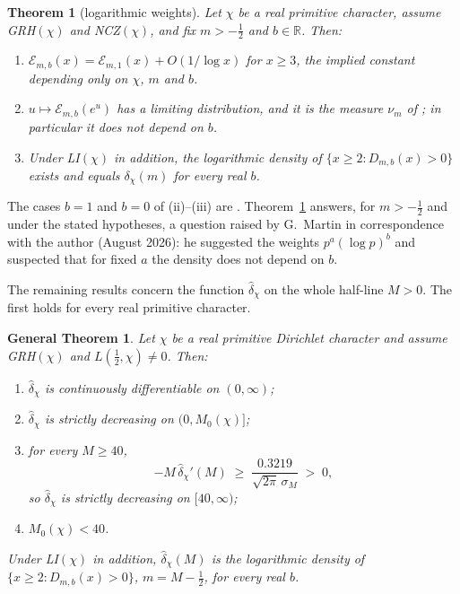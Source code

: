 \documentclass[11pt]{amsart}
\newtheorem{letterthm}{Theorem}
\newtheorem*{genthm}{General Theorem}
\theoremstyle{definition}
\numberwithin{equation}{section}
\newcommand{\cE}{\mathcal E}
\newcommand{\hd}{\widehat\delta}
\begin{document}
\begin{letterthm}[logarithmic weights]\label{thm:C}
Let $\chi$ be a real primitive character, assume GRH$(\chi)$ and
NCZ$(\chi)$, and fix $m>-\tfrac12$ and $b\in\mathbb R$. Then:
\begin{enumerate}
\item[(i)] $\cE_{m,b}(x)=\cE_{m,1}(x)+O(1/\log x)$ for $x\ge3$, the
implied constant depending only on $\chi$, $m$ and $b$.
\item[(ii)] $u\mapsto\cE_{m,b}(e^u)$ has a limiting distribution, and
it is the measure $\nu_m$ of \cite[Theorem~1]{WR}; in particular it
does not depend on $b$.
\item[(iii)] Under LI$(\chi)$ in addition, the logarithmic density of
$\{x\ge2:D_{m,b}(x)>0\}$ exists and equals $\delta_\chi(m)$ for every
real $b$.
\end{enumerate}
\end{letterthm}

The cases $b=1$ and $b=0$ of (ii)--(iii) are \cite[Theorem~1,
Proposition~1]{WR}. Theorem~\ref{thm:C} answers, for $m>-\tfrac12$
and under the stated hypotheses, a question raised by G.~Martin in
correspondence with the author (August 2026): he suggested the weights
$p^a(\log p)^b$ and suspected that for fixed $a$ the density does not
depend on $b$.

The remaining results concern the function $\hd_\chi$ on the whole
half-line $M>0$. The first holds for every real primitive character.

\begin{genthm}
Let $\chi$ be a real primitive Dirichlet character and assume
GRH$(\chi)$ and $L(\tfrac12,\chi)\ne0$. Then:
\begin{enumerate}
\item[(i)] $\hd_\chi$ is continuously differentiable on $(0,\infty)$;
\item[(ii)] $\hd_\chi$ is strictly decreasing on $(0,M_0(\chi)]$;
\item[(iii)] for every $M\ge40$,
\[
-M\,\hd_\chi'(M)\;\ge\;\frac{0.3219}{\sqrt{2\pi}\,\sigma_M}\;>\;0 ,
\]
so $\hd_\chi$ is strictly decreasing on $[40,\infty)$;
\item[(iv)] $M_0(\chi)<40$.
\end{enumerate}
Under LI$(\chi)$ in addition, $\hd_\chi(M)$ is the logarithmic density
of $\{x\ge2:D_{m,b}(x)>0\}$, $m=M-\tfrac12$, for every real $b$.
\end{genthm}
\end{document}
